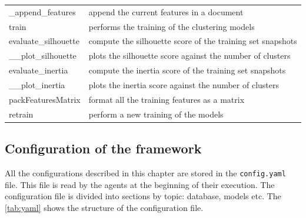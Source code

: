 \begin{longtable}{p{}p{}}
    \_append\_features & append the current features in a document \\
    train & performs the training of the clustering models \\
    evaluate\_silhouette & compute the silhouette score of the training set snapshots \\
    \_\_plot\_silhouette & plots the silhouette score against the number of clusters \\
    evaluate\_inertia & compute the inertia score of the training set snapshots \\
    \_\_plot\_inertia & plots the inertia score against the number of clusters \\
    packFeaturesMatrix & format all the training features as a matrix \\
    retrain & perform a new training of the models \\
    \bottomrule
    \end{longtable}
    
\newpage
\subsection{Configuration of the framework}
All the configurations described in this chapter are stored in the \texttt{config.yaml} file. This file is read by the agents at the beginning of their execution. The configuration file is divided into sections by topic: database, models etc. The \autoref{tab:yaml} shows the structure of the configuration file.


